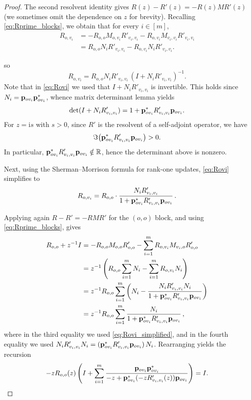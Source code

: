 \documentclass[10pt,a4paper]{amsart}
\numberwithin{equation}{section}
\newcommand{\R}{\mathbb R}
\newcommand{\ii}{\mathrm{i}}
\newcommand{\p}{{\bf p}}
\begin{document}
\begin{proof}
The second resolvent identity gives $R(z)-R'(z)=-R(z)MR'(z)$ (we sometimes omit the dependence on $z$ for brevity). 
Recalling \eqref{eq:Rprime_blocks}, we obtain that for every $i\in[m]$,
\begin{align*}
R_{o,v_i}
&=-R_{o,o}M_{o,v_i}R'_{v_i,v_i}-R_{o,v_i}M_{v_i,v_i}R'_{v_i,v_i}\\
&=R_{o,o}N_iR'_{v_i,v_i}-R_{o,v_i}N_iR'_{v_i,v_i}.
\end{align*}

so
\begin{equation}\label{eq:Rovi}
R_{o,v_i}=R_{o,o}N_iR'_{v_i,v_i}\,(I+N_iR'_{v_i,v_i})^{-1}.
\end{equation}
Note that in \eqref{eq:Rovi} we used that $I+N_iR'_{v_i,v_i}$ is invertible. This holds since $N_i=\p_{ov_i}\p_{ov_i}^*$, whence matrix determinant lemma yields
\[
\det(I+N_iR'_{v_i,v_i})=1+\p_{ov_i}^*R'_{v_i,v_i}\p_{ov_i}.
\]
For $z=\ii s$ with $s>0$, since $R'$ is the resolvent of a self-adjoint operator, we have
\[
\Im\bigl(\p_{ov_i}^*R'_{v_i,v_i}\p_{ov_i}\bigr)>0.
\]
In particular, $\p_{ov_i}^*R'_{v_i,v_i}\p_{ov_i}\notin\R$,
hence the determinant above is nonzero.  

Next, using the Sherman--Morrison formula for rank-one updates, \eqref{eq:Rovi} simplifies to
\begin{equation}\label{eq:Rovi_simplified}
R_{o,v_i}
=
R_{o,o}\cdot \frac{N_iR'_{v_i,v_i}}{1+\p_{ov_i}^*R'_{v_i,v_i}\p_{ov_i}}\,.
\end{equation}

Applying again $R-R'=-RMR'$ for the $(o,o)$ block, and using \eqref{eq:Rprime_blocks}, gives
\begin{align*}
R_{o,o}+z^{-1}I
&=-R_{o,o}M_{o,o}R'_{o,o}-\sum_{i=1}^m R_{o,v_i}M_{v_i,o}R'_{o,o}\\
&=z^{-1}\left(R_{o,o}\sum_{i=1}^m N_i-\sum_{i=1}^m R_{o,v_i}N_i\right)\\
&=z^{-1}R_{o,o}\sum_{i=1}^m\left(N_i-\frac{N_iR'_{v_i,v_i}N_i}{1+\p_{ov_i}^*R'_{v_i,v_i}\p_{ov_i}}\right)\\
&=z^{-1}R_{o,o}\sum_{i=1}^m\frac{N_i}{1+\p_{ov_i}^*R'_{v_i,v_i}\p_{ov_i}}\,,
\end{align*}
where in the third equality we used \eqref{eq:Rovi_simplified}, and in the fourth equality we used
$N_iR'_{v_i,v_i}N_i=(\p_{ov_i}^*R'_{v_i,v_i}\p_{ov_i})\,N_i$.
Rearranging yields the recursion
\begin{equation}\label{eq:recursion}
-zR_{o,o}(z)\left(I+\sum_{i=1}^m\frac{\p_{ov_i}\p_{ov_i}^*}{-z+\p_{ov_i}^*(-zR'_{v_i,v_i}(z))\p_{ov_i}}\right)=I.
\end{equation}


\end{proof}
\end{document}

